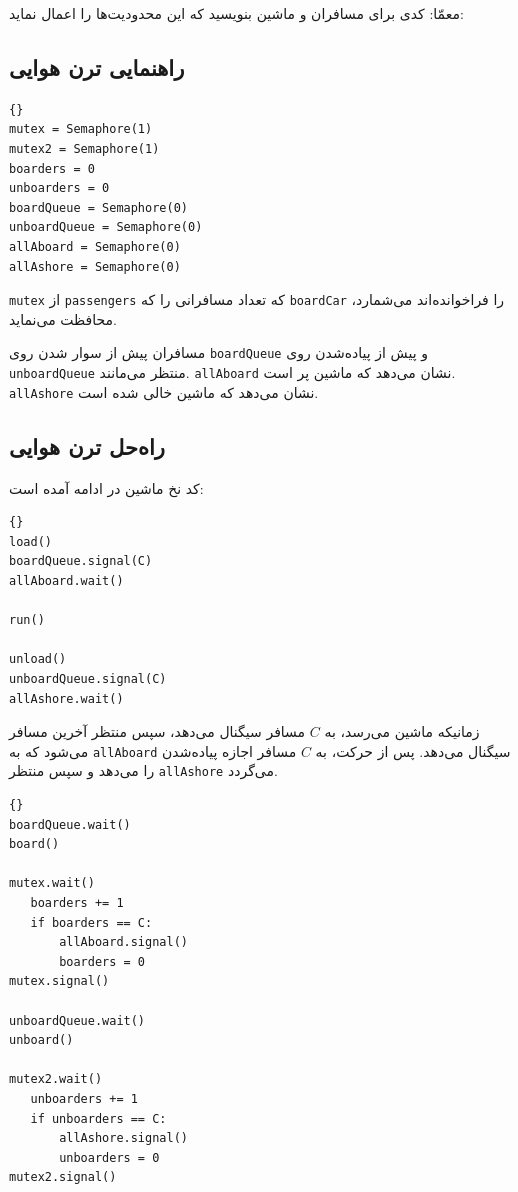 \documentclass{book}
\newcommand{\clearemptydoublepage}{}%
\begin{document}
    معمّا: کدی برای مسافران و ماشین بنویسید که این محدودیت‌ها را اعمال نماید:


\clearemptydoublepage
\subsection{راهنمایی ترن هوایی}

\begin{latin}
\begin{lstlisting}[title=\rl{راهنمایی ترن هوایی}]{}
mutex = Semaphore(1)
mutex2 = Semaphore(1)
boarders = 0
unboarders = 0
boardQueue = Semaphore(0)
unboardQueue = Semaphore(0)
allAboard = Semaphore(0)
allAshore = Semaphore(0)
\end{lstlisting}
\end{latin}

    {\tt mutex} از {\tt passengers} که
    تعداد  مسافرانی را که {\tt boardCar} را فراخوانده‌اند می‌شمارد، محافظت می‌نماید. 
    
    مسافران پیش از سوار شدن  روی {\tt boardQueue}   و پیش از پیاده‌شدن روی {\tt unboardQueue} منتظر می‌مانند.   {\tt allAboard}
    نشان می‌دهد که ماشین پر است. {\tt allAshore} نشان می‌دهد که ماشین خالی شده است. 


\clearemptydoublepage
\subsection{راه‌حل ترن هوایی}

    کد نخ ماشین در ادامه آمده است: 

\begin{latin}
\begin{lstlisting}[title=\rl{راه‌حل ترن هوایی (ماشین)}]{} 
load()
boardQueue.signal(C)
allAboard.wait()

run()

unload()
unboardQueue.signal(C)
allAshore.wait()
\end{lstlisting}
\end{latin}

    زمانیکه ماشین می‌رسد، به $C$  مسافر سیگنال می‌دهد، سپس منتظر آخرین مسافر می‌شود که به {\tt allAboard} سیگنال می‌دهد. 
    پس از حرکت، به $C$ مسافر اجازه پیاده‌شدن را می‌دهد و سپس منتظر {\tt allAshore} می‌گردد. 
\begin{latin}
\begin{lstlisting}[title=\rl{راه‌حل ترن هوایی (مسافر)}]{} 
boardQueue.wait()
board()

mutex.wait()
   boarders += 1
   if boarders == C:
       allAboard.signal()
       boarders = 0
mutex.signal()

unboardQueue.wait()
unboard()

mutex2.wait()
   unboarders += 1
   if unboarders == C:
       allAshore.signal()
       unboarders = 0
mutex2.signal()
\end{lstlisting}
\end{latin}
\end{document}
